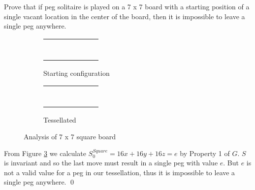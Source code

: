 \documentclass[11pt]{article}
\renewenvironment{proof}{{\noindent\bfseries Proof.}}{\qed}
\newenvironment{problem}[2][Problem]{\begin{trivlist}
\item[\hskip \labelsep {\bfseries #1}\hskip \labelsep {\bfseries #2.}]}{\end{trivlist}}
\newcommand*\cir[1]{
  \begin{tikzpicture}[baseline]
    \node[draw,circle,inner sep=0pt,minimum size=12pt,anchor=center](C){#1};
  \end{tikzpicture}}
\newcommand*\h{\cir{}}
\newcommand*\p{
  \begin{tikzpicture}[baseline]
    \node[draw,circle,inner sep=0pt,minimum size=12pt,anchor=center](C){};
    \node[fill=black,circle,inner sep=0pt,minimum size=5pt,anchor=center](C){};
  \end{tikzpicture}}
\newcommand*\x{\cir{$x$}}
\newcommand*\y{\cir{$y$}}
\newcommand*\z{\cir{$z$}}
\newcommand*\squaresevenstart{
\begin{tabular}{m{3pt} m{3pt} m{3pt} m{3pt} m{3pt} m{3pt} m{3pt}}
\p & \p & \p & \p & \p & \p & \p \\
\p & \p & \p & \p & \p & \p & \p \\
\p & \p & \p & \p & \p & \p & \p \\
\p & \p & \p & \h & \p & \p & \p \\
\p & \p & \p & \p & \p & \p & \p \\
\p & \p & \p & \p & \p & \p & \p \\
\p & \p & \p & \p & \p & \p & \p \\
\end{tabular}}
\newcommand*\squareseventessellatedstart{
\begin{tabular}{m{3pt} m{3pt} m{3pt} m{3pt} m{3pt} m{3pt} m{3pt}}
\x & \y & \z & \x & \y & \z & \x \\
\y & \z & \x & \y & \z & \x & \y \\
\z & \x & \y & \z & \x & \y & \z \\
\x & \y & \z & \x & \y & \z & \x \\
\y & \z & \x & \y & \z & \x & \y \\
\z & \x & \y & \z & \x & \y & \z \\
\x & \y & \z & \x & \y & \z & \x \\
\end{tabular}}
\begin{document}
\begin{problem}{1}
Prove that if peg solitaire is played on a 7 x 7 board with a starting position of a single vacant location in the center of the board, then it is impossible to leave a single peg anywhere.

\begin{figure}[h]
\centering
\begin{subfigure}{.5\textwidth}
\centering
\squaresevenstart
\caption{Starting configuration}\label{subfig:squareanalysis:a}
\end{subfigure}%
\begin{subfigure}{.5\textwidth}
\centering
\squareseventessellatedstart
\caption{Tessellated}\label{subfig:squareanalysis:b}
\end{subfigure}
\caption{Analysis of 7 x 7 square board}
\label{fig:squareanalysis}
\end{figure}

\begin{proof}
From Figure \ref{fig:squareanalysis} we calculate $S^{Square}_0 = 16x + 16y + 16z = e$ by Property 1 of $G$. $S$ is invariant and so the last move must result in a single peg with value $e$. But $e$ is not a valid value for a peg in our tessellation, thus it is impossible to leave a single peg anywhere.
\end{proof}
\end{problem}
\end{document}
